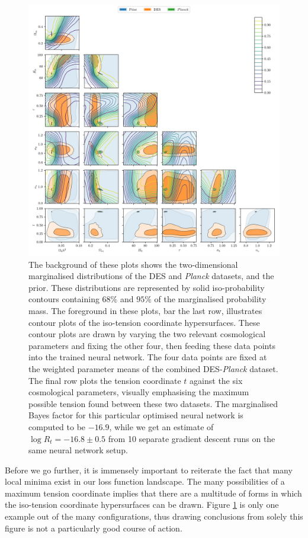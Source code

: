 \documentclass[%
 reprint,
 amsmath,amssymb,
 aps,
]{revtex4-2}
\begin{document}
\begin{figure}
    \includegraphics[width=\textwidth]{../plots/six.png}
    \centering
    \caption{The background of these plots shows the two-dimensional marginalised distributions of the DES and \textit{Planck} datasets, and the prior. These distributions are represented by solid iso-probability contours containing $68\%$ and $95\%$ of the marginalised probability mass. The foreground in these plots, bar the last row, illustrates contour plots of the iso-tension coordinate hypersurfaces. These contour plots are drawn by varying the two relevant cosmological parameters and fixing the other four, then feeding these data points into the trained neural network. The four data points are fixed at the weighted parameter means of the combined DES-\textit{Planck} dataset. The final row plots the tension coordinate $t$ against the six cosmological parameters, visually emphasising the maximum possible tension found between these two datasets. The marginalised Bayes factor for this particular optimised neural network is computed to be $-16.9$, while we get an estimate of $\log R_t = -16.8 \pm 0.5$ from 10 separate gradient descent runs on the same neural network setup.}
    \label{fig:six}
\end{figure}

Before we go further, it is immensely important to reiterate the fact that many local minima exist in our loss function landscape. The many possibilities of a maximum tension coordinate implies that there are a multitude of forms in which the iso-tension coordinate hypersurfaces can be drawn. Figure \ref{fig:six} is only one example out of the many configurations, thus drawing conclusions from solely this figure is not a particularly good course of action.
\end{document}
